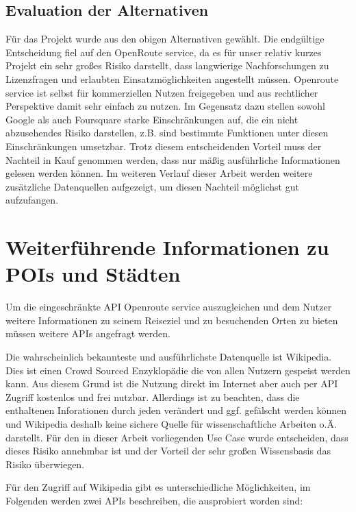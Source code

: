 \subsection{Evaluation der Alternativen}
Für das Projekt wurde aus den obigen Alternativen gewählt. Die endgültige Entscheidung fiel auf den OpenRoute service, da es für unser relativ kurzes Projekt ein sehr großes Risiko darstellt, dass langwierige Nachforschungen zu Lizenzfragen und erlaubten Einsatzmöglichkeiten angestellt müssen. Openroute service ist selbst für kommerziellen Nutzen freigegeben und aus rechtlicher Perspektive damit sehr einfach zu nutzen. Im Gegensatz dazu stellen sowohl Google als auch Foursquare starke Einschränkungen auf, die ein nicht abzusehendes Risiko darstellen, z.B. sind bestimmte Funktionen unter diesen Einschränkungen umsetzbar. Trotz diesem entscheidenden Vorteil muss der Nachteil in Kauf genommen werden, dass nur mäßig ausführliche Informationen gelesen werden können. Im weiteren Verlauf dieser Arbeit werden weitere zusätzliche Datenquellen aufgezeigt, um diesen Nachteil möglichst gut aufzufangen.

\section{Weiterführende Informationen zu POIs und Städten}
Um die eingeschränkte API Openroute service auszugleichen und dem Nutzer weitere Informationen zu seinem Reiseziel und zu besuchenden Orten zu bieten müssen weitere APIs angefragt werden.

\vspace{0.25cm}

Die wahrscheinlich bekannteste und ausführlichste Datenquelle ist Wikipedia. Dies ist einen Crowd Sourced Enzyklopädie die von allen Nutzern gespeist werden kann. Aus diesem Grund ist die Nutzung direkt im Internet aber auch per API Zugriff kostenlos und frei nutzbar. Allerdings ist zu beachten, dass die enthaltenen Inforationen durch jeden verändert und ggf. gefälscht werden können und Wikipedia deshalb keine sichere Quelle für wissenschaftliche Arbeiten o.Ä. darstellt. Für den in dieser Arbeit vorliegenden Use Case wurde entscheiden, dass dieses Risiko annehmbar ist und der Vorteil der sehr großen Wissensbasis das Risiko überwiegen. 

\vspace{0.25cm}

Für den Zugriff auf Wikipedia gibt es unterschiedliche Möglichkeiten, im Folgenden werden zwei APIs beschreiben, die ausprobiert worden sind:

